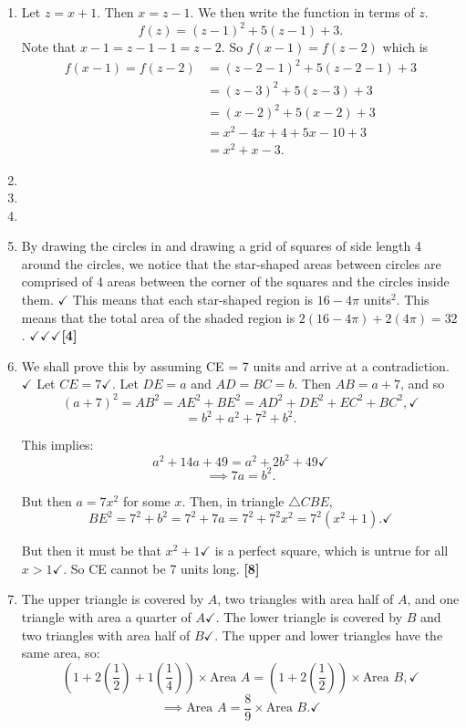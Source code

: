 \documentclass[12pt]{article}
\begin{document}
\begin{enumerate}[topsep=2\bigskipamount,itemsep=\bigskipamount]
\item Let $z=x+1$. Then $x=z-1$. We then write the function in terms of $z$.
\begin{equation*}
    f(z)= (z-1)^{2}+5(z-1)+3.
\end{equation*}
Note that $x-1=z-1-1=z-2$. So $f(x-1)=f(z-2)$ which is 
\begin{align*}
    f(x-1)=f(z-2)&=(z-2-1)^{2}+5(z-2-1)+3\\
    &=(z-3)^{2}+5(z-3)+3\\
    &=(x-2)^{2}+5(x-2)+3\\
    &= x^{2}-4x+4+5x-10+3\\
    &= x^{2}+x-3.
\end{align*}

\item

\item 

\item 

 \item By drawing the circles in and drawing a grid of squares of side length 4 around the circles, we notice that the star-shaped areas between circles are comprised of 4 areas between the corner of the squares and the circles inside them. $\checkmark$ This means that each star-shaped region is $16-4\pi$ units$^2$. This means that the total area of the shaded region is $2(16-4\pi)+2(4\pi) = 32$. $\checkmark \checkmark \checkmark$\textbf{[4]} 
    \item We shall prove this by assuming CE = 7 units and arrive at a contradiction. $\checkmark$ 
    Let $CE = 7\checkmark$. Let $DE = a$ and $AD = BC = b$. Then $AB = a + 7$, and so
\[
(a + 7)^2 = AB^2 = AE^2 + BE^2 = AD^2 + DE^2 + EC^2 + BC^2, \checkmark
\]
\[
= b^2 + a^2 + 7^2 + b^2.
\]

This implies:
\[
a^2+14a+49 = a^2 +2b^2+49 \checkmark
\]
\[
\implies 7a = b^2.
\]

But then $a=7x^2$ for some $x$.\checkmark
Then, in triangle $\triangle CBE$,
\[
BE^2 = 7^2 + b^2 = 7^2 + 7a = 7^2 + 7^2x^2 = 7^2(x^2+1). \checkmark
\]

But then it must be that $x^2+1 \checkmark$ is a perfect square, which is untrue for all $x>1\checkmark$. So CE cannot be 7 units long.\textbf{ [8]}

\item The upper triangle is covered by $A$, two triangles with area half of $A$, and one triangle with area a quarter of $A\checkmark$.  
The lower triangle is covered by $B$ and two triangles with area half of $B\checkmark$.  
The upper and lower triangles have the same area, so:
\[
\left(1 + 2 \left(\frac{1}{2}\right) + 1 \left(\frac{1}{4}\right)\right) \times \text{Area } A = \left(1 + 2 \left(\frac{1}{2}\right)\right) \times \text{Area } B, \checkmark
\]
\[
\implies \text{Area } A = \frac{8}{9} \times \text{Area } B.\checkmark
\]


\end{enumerate}
\end{document}
